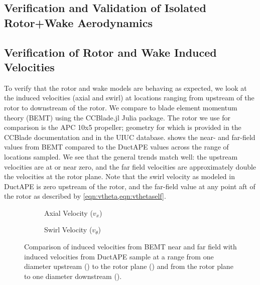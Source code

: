 \subsection{Verification and Validation of Isolated Rotor+Wake Aerodynamics}
\label{ssec:rwvv}

\subsection{Verification of Rotor and Wake Induced Velocities}

To verify that the rotor and wake models are behaving as expected, we look at the induced velocities (axial and swirl) at locations ranging from upstream of the rotor to downstream of the rotor.
%
We compare to blade element momentum theory (BEMT) using the CCBlade.jl Julia package.
%
The rotor we use for comparison is the APC 10x5 propeller; geometry for which is provided in the CCBlade documentation and in the UIUC database.
%
 shows the near- and far-field values from BEMT compared to the DuctAPE values across the range of locations sampled.
%
We see that the general trends match well: the upstream velocities are at or near zero, and the far field velocities are approximately double the velocities at the rotor plane.
%
Note that the swirl velocity as modeled in DuctAPE is zero upstream of the rotor, and the far-field value at any point aft of the rotor as described by \cref{eqn:vtheta,eqn:vthetaself}.


\begin{figure}[htb]
     \centering
     \begin{subfigure}[t]{0.45\textwidth}
        \centering
        \raisebox{-3em}{}
        \caption{Axial Velocity (\(v_x\))}
        \label{}
     \end{subfigure}
     \hfill
     \begin{subfigure}[t]{0.45\textwidth}
         \centering
        \raisebox{-3em}{}
        \caption{Swirl Velocity (\(v_\theta\))}
        \label{}
     \end{subfigure}
     \caption{Comparison of induced velocities from BEMT near and far field with induced velocities from DuctAPE sample at a range from one diameter upstream () to the rotor plane () and from the rotor plane to one diameter downstream ().}
    \label{fig:inducedvelcheck}
\end{figure}


